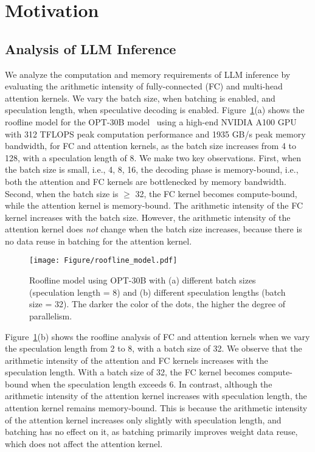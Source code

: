 \section{Motivation}
\label{sec:motiv}





\subsection{Analysis of LLM Inference}



We analyze the computation and memory requirements of LLM inference by evaluating the arithmetic intensity of fully-connected (FC) and multi-head attention kernels. We vary the batch size, when batching is enabled, and speculation length, when speculative decoding is enabled. Figure~\ref{fig:roofline-model}(a) shows the roofline model for the OPT-30B model~\cite{brown2020language} using a high-end NVIDIA A100 GPU~\cite{choquette2020nvidia} with 312 TFLOPS peak computation performance and 1935 GB/s peak memory bandwidth, for FC and attention kernels, as the batch size increases from 4 to 128, with a speculation length of 8. We make two key observations.
First, when the batch size is small, i.e., 4, 8, 16, the decoding phase is memory-bound, i.e., both the attention and FC kernels are bottlenecked by memory bandwidth.
Second, when the batch size is $\geq$ 32, the FC kernel becomes compute-bound, while the attention kernel is memory-bound.
The arithmetic intensity of the FC kernel increases with the batch size. However, the arithmetic intensity of the attention kernel does \emph{not} change when the batch size increases, because there is no data reuse in batching for the attention kernel.


\begin{figure}[b]

\centering
\texttt{[image: Figure/roofline\_model.pdf]}
\caption{Roofline model using OPT-30B with (a) different batch sizes (speculation length = 8) and (b) different speculation lengths (batch size = 32). The darker the color of the dots, the higher the degree of parallelism.}
\label{fig:roofline-model}

\end{figure}




Figure~\ref{fig:roofline-model}(b) shows the roofline analysis of FC and attention kernels when we vary the speculation length from 2 to 8, with a batch size of 32. 
We observe that the arithmetic intensity of the attention and FC kernels increases with the speculation length. With a batch size of 32, the FC kernel becomes compute-bound when the speculation length exceeds 6. In contrast, although the arithmetic intensity of the attention kernel increases with speculation length, the attention kernel remains memory-bound. This is because the arithmetic intensity of the attention kernel increases only slightly with speculation length, and batching has no effect on it, as batching primarily improves weight data reuse, which does not affect the attention kernel.




